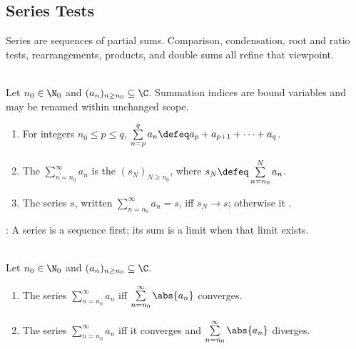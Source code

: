 \subsection{Series Tests}

%


Series are sequences of partial sums. Comparison, condensation, root and ratio tests, rearrangements, products, and double sums all refine that viewpoint.

\begin{definition} \label{def:series-and-partial-sums} \\
Let $n_0\in\N_0$ and $(a_n)_{n\geq n_0}\subseteq\C$. Summation indices are bound variables and may be renamed within unchanged scope.
\begin{enumerate}[label=(\roman*)]
\setlength{\itemsep}{0pt}
\item For integers $n_0\leq p\leq q$, $\sum\limits_{n=p}^{q}a_n\defeq a_p+a_{p+1}+\cdots+a_q$.
\item The  $\sum\limits_{n=n_0}^{\infty}a_n$ is the  $(s_N)_{N\geq n_0}$, where $s_N\defeq\sum\limits_{n=n_0}^{N}a_n$.
\item The series  $s$, written $\sum\limits_{n=n_0}^{\infty}a_n=s$, iff $s_N\to s$; otherwise it .
\end{enumerate}
: A series is a sequence first; its sum is a limit when that limit exists.
\end{definition}

\begin{definition} \label{def:absolute-and-nonabsolute-convergence} \\
Let $n_0\in\N_0$ and $(a_n)_{n\geq n_0}\subseteq\C$.
\begin{enumerate}[label=(\roman*)]
\setlength{\itemsep}{0pt}
\item The series $\sum\limits_{n=n_0}^{\infty}a_n$  iff $\sum\limits_{n=n_0}^{\infty}\abs{a_n}$ converges.
\item The series $\sum\limits_{n=n_0}^{\infty}a_n$  iff it converges and $\sum\limits_{n=n_0}^{\infty}\abs{a_n}$ diverges.
\end{enumerate}
\end{definition}

